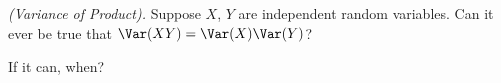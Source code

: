 \begin{problem}[Handout 9, \# 14]
  \emph{(Variance of Product).} Suppose \(X\), \(Y\) are independent
  random variables. Can it ever be true that \(\Var(XY)=\Var(X)\Var(Y)\)?

  \noindent If it can, when?
\end{problem}
\begin{solution}

\end{solution}

